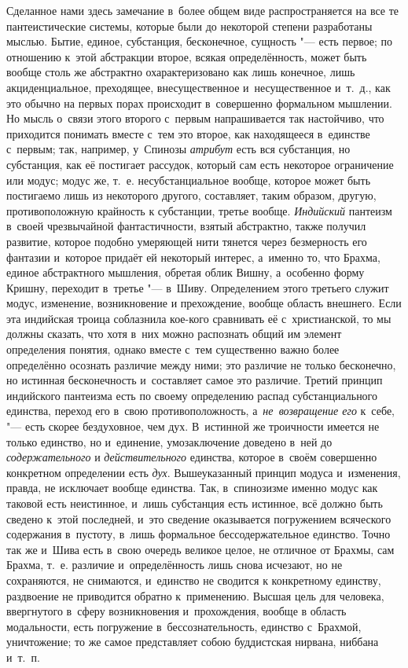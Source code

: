 Сделанное нами здесь замечание в~более общем виде распространяется на все те
пантеистические системы, которые были до некоторой степени разработаны мыслью.
Бытие, единое, субстанция, бесконечное, сущность "--- есть первое; по отношению
к~этой абстракции второе, всякая определённость, может быть вообще столь же
абстрактно охарактеризовано как лишь конечное, лишь акциденциальное,
преходящее, внесущественное и~несущественное и~т.~д., как это обычно на первых
порах происходит в~совершенно формальном мышлении. Но мысль о~связи этого
второго с~первым напрашивается так настойчиво, что приходится понимать вместе
с~тем это второе, как находящееся в~единстве с~первым; так, например, у~Спинозы
{\em атрибут} есть вся субстанция, но субстанция, как её постигает рассудок,
который сам есть некоторое ограничение или модус; модус же, т.~е.
несубстанциальное вообще, которое может быть постигаемо лишь из некоторого
другого, составляет, таким образом, другую, противоположную крайность к
субстанции, третье вообще. {\em Индийский} пантеизм в~своей чрезвычайной
фантастичности, взятый абстрактно, также получил развитие, которое подобно
умеряющей нити тянется через безмерность его фантазии и~которое придаёт ей
некоторый интерес, а~именно то, что Брахма, единое абстрактного мышления,
обретая облик Вишну, а~особенно форму Кришну, переходит в~третье "---
в~Шиву. Определением этого третьего служит модус, изменение, возникновение и
прехождение, вообще область внешнего. Если эта индийская троица соблазнила
кое-кого сравнивать её с~христианской, то мы должны сказать, что хотя в~них
можно распознать общий им элемент определения понятия, однако вместе с~тем
существенно важно более определённо осознать различие между ними; это различие
не только бесконечно, но истинная бесконечность и~составляет самое это
различие. Третий принцип индийского пантеизма есть по своему определению распад
субстанциального единства, переход его в~свою противоположность,
а~{\em не~возвращение его} к~себе, "--- есть скорее бездуховное, чем дух.
В~истинной же троичности имеется не только единство, но и~единение,
умозаключение доведено в~ней до {\em содержательного} и {\em действительного}
единства, которое в~своём совершенно конкретном определении есть {\em дух}.
Вышеуказанный принцип модуса и~изменения, правда, не исключает вообще единства.
Так, в~спинозизме именно модус как таковой есть неистинное, и~лишь субстанция
есть истинное, всё должно быть сведено к~этой последней, и~это сведение
оказывается погружением всяческого содержания в~пустоту, в~лишь формальное
бессодержательное единство. Точно так же и~Шива есть в~свою очередь великое
целое, не отличное от Брахмы, сам Брахма, т.~е. различие и~определённость лишь
снова исчезают, но не сохраняются, не снимаются, и~единство не сводится к
конкретному единству, раздвоение не приводится обратно к~применению. Высшая
цель для человека, ввергнутого в~сферу возникновения и~прохождения, вообще в
область модальности, есть погружение в~бессознательность, единство с~Брахмой,
уничтожение; то же самое представляет собою буддистская нирвана, ниббана
и~т.~п.

